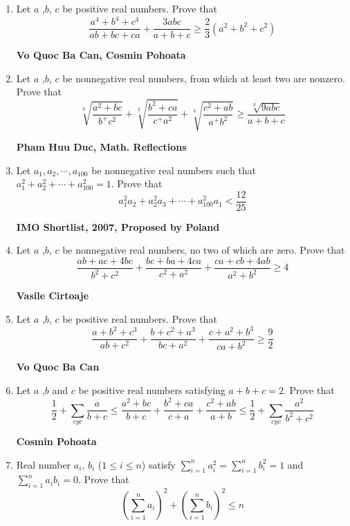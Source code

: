 \documentclass{article}
\begin{document}
\begin{enumerate}
\item Let $a$ ,$b$, $c$ be positive real numbers. Prove that $$\frac{a^4+b^4+c^4}{ab+bc+ca}+\frac{3abc}{a+b+c}\geq \frac{2}{3}\left(a^2+b^2+c^2\right)$$
\begin{flushright}
	\textbf{Vo Quoc Ba Can, Cosmin Pohoata}
\end{flushright}
\item Let $a$ ,$b$, $c$ be nonnegative real numbers, from which at least two are nonzero. Prove that $$\sqrt[3]{\frac{a^2+bc}{b^+c^2}}+\sqrt[3]{\frac{b^2+ca}{c^+a^2}}+\sqrt[3]{\frac{c^2+ab}{a^+b^2}}\geq\frac{\sqrt[3]{9abc}}{a+b+c}$$
\begin{flushright}
	\textbf{Pham Huu Duc, Math. Reflections}
\end{flushright}
\item Let $a_1,a_2,\cdots ,a_{100}$ be nonnegative real numbers such that $a_1^2+a_2^2+\cdots+a_{100}^2=1$. Prove that$$a_1^2a_2+a_2^2a_3+\cdots+a_{100}^2a_1<\frac{12}{25}$$
\begin{flushright}
	\textbf{IMO Shortlist, 2007, Proposed by Poland}
\end{flushright}
\item Let $a$ ,$b$, $c$ be nonnegative real numbers, no two of which are zero. Prove that $$\frac{ab+ac+4bc}{b^2+c^2}+\frac{bc+ba+4ca}{c^2+a^2}+\frac{ca+cb+4ab}{a^2+b^2}\geq 4$$
\begin{flushright}
	\textbf{Vasile Cirtoaje}
\end{flushright}
\item Let $a$ ,$b$, $c$ be positive real numbers. Prove that $$\frac{a+b^2+c^3}{ab+c^2}+\frac{b+c^2+a^3}{bc+a^2}+\frac{c+a^2+b^3}{ca+b^2}\geq \frac{9}{2}$$
\begin{flushright}
	\textbf{Vo Quoc Ba Can}
\end{flushright}
\item Let $a$ ,$b$ and $c$ be positive real numbers satisfying $a+b+c=2$. Prove that $$\frac{1}{2}+\sum \limits_{cyc}\frac{a}{b+c}\leq \frac{a^2+bc}{b+c}+\frac{b^2+ca}{c+a}+\frac{c^2+ab}{a+b}\leq \frac{1}{2}+\sum \limits_{cyc} \frac{a^2}{b^2+c^2}$$
\begin{flushright}
	\textbf{Cosmin Pohoata}
\end{flushright}
\item Real number $a_i$, $b_i$ ($1\leq i\leq n$) satisfy $\sum \limits_{i=1}^n a_i^2=\sum \limits_{i=1}^n b_i^2=1$ and $\sum \limits_{i=1}^n a_ib_i=0$. Prove that $$\left(\sum \limits_{i=1}^n a_i\right)^2+\left(\sum \limits_{i=1}^n b_i\right)^2\leq n$$
\begin{flushright}

\end{flushright}
\end{enumerate}
\end{document}
